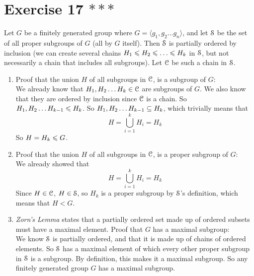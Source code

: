 \documentclass[12pt]{article}
\begin{document}
    \section*{Exercise 17 $***$}
    Let $G$ be a finitely generated group
    where $G = \langle g_1, g_2 \dots g_n \rangle$,
    and let $\mathcal{S}$ be the set of all proper subgroups of $G$
    (all by $G$ itself).
    Then $\mathcal{S}$ is partially ordered by inclusion
    (we can create several chains $H_1 \seq H_2 \seq \dots \seq H_k$
    in $\mathcal{S}$, but not necessarily a chain that includes all subgroups).
    Let $\mathcal{C}$ be such a chain in $\mathcal{S}$.
    \begin{enumerate}[label=\textbf{\alph*.}]
        \item
            Proof that the union $H$ of all subgroups in $\mathcal{C}$,
            is a subgroup of $G$: \\
            We already know that $H_1, H_2 \dots H_k \in \mathcal{C}$
            are subgroups of $G$.
            We also know that they are ordered by inclusion
            since $\mathcal{C}$ is a chain.
            So $H_1, H_2 \dots H_{k-1} \leqslant H_k$.
            So $H_1, H_2 \dots H_{k-1} \subseteq H_k$,
            which trivially means that
            \[ H = \bigcup_{i = 1}^k H_i = H_k \]
            So $H = H_k \leqslant G$. 
        \item
            Proof that the union $H$ of all subgroups in $\mathcal{C}$,
            is a proper subgroup of $G$: \\
            We already showed that 
            \[ H = \bigcup_{i = 1}^k H_i = H_k \]
            Since $H \in \mathcal{C}$, $H \in \mathcal{S}$,
            so $H_k$ is a proper subgroup by $\mathcal{S}$'s definition,
            which means that $H < G$.
        \item
            \textit{Zorn's Lemma} states that a partially ordered
            set made up of ordered subsets must have a maximal element.
            Proof that $G$ has a maximal subgroup: \\
            We know $\mathcal{S}$ is partially ordered,
            and that it is made up of chains of ordered elements.
            So $\mathcal{S}$ has a maximal element 
            of which every other proper subgroup in $\mathcal{S}$
            is a subgroup.
            By definition, this makes it a maximal subgroup.
            So any finitely generated group $G$ has a maximal subgroup.
    \end{enumerate}
\end{document}
